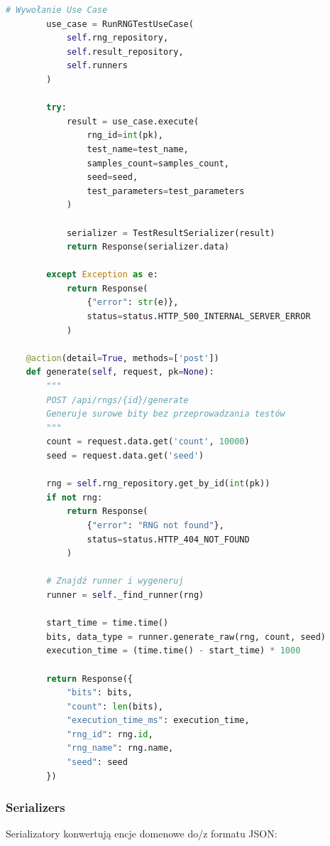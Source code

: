 \documentclass[12pt,a4paper]{article}
\begin{document}
\begin{lstlisting}[language=Python, caption=RNGViewSet - główny endpoint dla RNG]
        # Wywołanie Use Case
        use_case = RunRNGTestUseCase(
            self.rng_repository,
            self.result_repository,
            self.runners
        )

        try:
            result = use_case.execute(
                rng_id=int(pk),
                test_name=test_name,
                samples_count=samples_count,
                seed=seed,
                test_parameters=test_parameters
            )

            serializer = TestResultSerializer(result)
            return Response(serializer.data)

        except Exception as e:
            return Response(
                {"error": str(e)},
                status=status.HTTP_500_INTERNAL_SERVER_ERROR
            )

    @action(detail=True, methods=['post'])
    def generate(self, request, pk=None):
        """
        POST /api/rngs/{id}/generate
        Generuje surowe bity bez przeprowadzania testów
        """
        count = request.data.get('count', 10000)
        seed = request.data.get('seed')

        rng = self.rng_repository.get_by_id(int(pk))
        if not rng:
            return Response(
                {"error": "RNG not found"},
                status=status.HTTP_404_NOT_FOUND
            )

        # Znajdź runner i wygeneruj
        runner = self._find_runner(rng)

        start_time = time.time()
        bits, data_type = runner.generate_raw(rng, count, seed)
        execution_time = (time.time() - start_time) * 1000

        return Response({
            "bits": bits,
            "count": len(bits),
            "execution_time_ms": execution_time,
            "rng_id": rng.id,
            "rng_name": rng.name,
            "seed": seed
        })
\end{lstlisting}

\subsubsection{Serializers}

Serializatory konwertują encje domenowe do/z formatu JSON:
\end{document}
